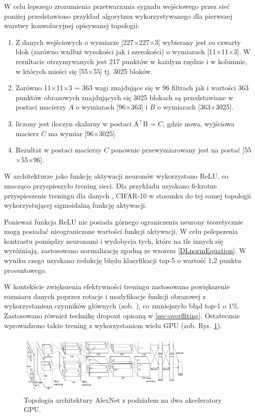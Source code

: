 W celu lepszego zrozumienia przetwarzania sygnału wejściowego przez sieć poniżej przedstawiono przykład algorytmu wykorzystywanego dla pierwszej warstwy konwolucyjnej opisywanej topologii: 
\begin{enumerate}
\item Z danych wejściowych o wymiarze [227$\times$227$\times$3] wybierany jest co czwarty blok (zarówno wzdłuż wysokości jak i szerokości) o wymiarach [11$\times$11$\times$3]. W rezultacie otrzymywanych jest 217 punktów w każdym rzędzie i w kolumnie, w których mieści się [55$\times$55] tj. 3025 bloków.
\item Zarówno 11$\times$11$\times$3 = 363 wagi znajdujące się w 96 filtrach jak i wartości 363 punktów obrazowych znajdujących się 3025 blokach są przedstawiane w postaci macierzy $A$ o wymiarach [96$\times$363] i $B$ o wymiarach [363$\times$3025].
\item liczony jest iloczyn skalarny w postaci A$^\intercal$B = $C$, gdzie nowa, wyjściowa macierz $C$ ma wymiar [96$\times$3025].
\item Rezultat w postaci macierzy $C$ ponownie przewymiarowany jest na postać [55$\times$55$\times$96].  
\end{enumerate} 

W architekturze jako funkcję aktywacji neuronów wykorzystano ReLU, co znacząco przyspieszyło trening sieci. Dla przykładu uzyskano 6-krotne przyspieszenie treningu dla danych \cite{CIFAR}, CIFAR-10 w stosunku do tej samej topologii wykorzystującej sigmoidalną funkcję aktywacji.

Ponieważ funkcja ReLU nie posiada górnego ograniczenia neurony teoretycznie mogą posiadać nieograniczone wartości funkcji aktywacji. W celu polepszenia kontrastu pomiędzy neuronami i wydobycia tych, które na tle innych się wyróżniają, zastosowano normalizację zgodną ze wzorem \ref{DLnormEquation}. W wyniku czego uzyskano redukcję błędu klasyfikacji top-5 o wartość 1,2 punktu procentowego.

W kontekście zwiększenia efektywności treningu zastosowano powiększenie rozmiaru danych poprzez rotacje i modyfikacje funkcji obrazowej z wykorzystaniem czynników głównych (zob. \cite{Krizhevsky2012}), co zmniejszyło błąd top-1 o 1\%. Zastosowano również technikę dropout opisaną w \ref{sec-overffiting}. Ostatecznie wprowadzono także trening z wykorzystaniem wielu GPU (zob. Rys. \ref{AlexNetTopologyMultiGPU}). 

\begin{figure}[h!]
	\centering
	\includegraphics[width=0.8\textwidth]{figures/AlexNet-multiGPU.png}
	\caption{Topologia architektury AlexNet z podziałem na dwa akceleratory GPU.}
	\label{AlexNetTopologyMultiGPU}
\end{figure}

